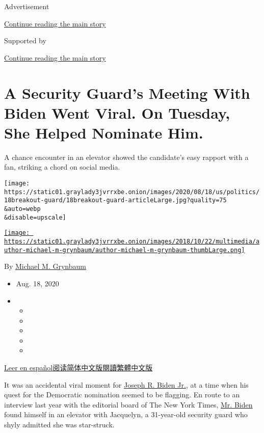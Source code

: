 Advertisement

\protect\hyperlink{after-top}{Continue reading the main story}

Supported by

\protect\hyperlink{after-sponsor}{Continue reading the main story}

\hypertarget{a-security-guards-meeting-with-biden-went-viral-on-tuesday-she-helped-nominate-him}{%
\section{A Security Guard's Meeting With Biden Went Viral. On Tuesday,
She Helped Nominate
Him.}\label{a-security-guards-meeting-with-biden-went-viral-on-tuesday-she-helped-nominate-him}}

A chance encounter in an elevator showed the candidate's easy rapport
with a fan, striking a chord on social media.

\texttt{[image: https://static01.graylady3jvrrxbe.onion/images/2020/08/18/us/politics/18breakout-guard/18breakout-guard-articleLarge.jpg?quality=75\\\&auto=webp\\\&disable=upscale]}

\href{https://www.nytimes3xbfgragh.onion/by/michael-m-grynbaum}{\texttt{[image: https://static01.graylady3jvrrxbe.onion/images/2018/10/22/multimedia/author-michael-m-grynbaum/author-michael-m-grynbaum-thumbLarge.png]}}

By
\href{https://www.nytimes3xbfgragh.onion/by/michael-m-grynbaum}{Michael
M. Grynbaum}

\begin{itemize}
\item
  Aug. 18, 2020
\item
  \begin{itemize}
  \item
  \item
  \item
  \item
  \item
  \end{itemize}
\end{itemize}

\href{https://www.nytimes3xbfgragh.onion/es/2020/08/19/espanol/estados-unidos/joe-biden-nominacion-guardia-seguridad.html}{Leer
en
español}\href{https://cn.nytimes3xbfgragh.onion/opinion/20200819/michelle-obama-dnc-election-2020/}{阅读简体中文版}\href{https://cn.nytimes3xbfgragh.onion/opinion/20200819/michelle-obama-dnc-election-2020/zh-hant/}{閱讀繁體中文版}

It was an accidental viral moment for
\href{https://www.nytimes3xbfgragh.onion/topic/person/joe-biden}{Joseph
R. Biden Jr.}, at a time when his quest for the Democratic nomination
seemed to be flagging. En route to an interview last year with the
editorial board of The New York Times,
\href{https://www.nytimes3xbfgragh.onion/2020/08/20/us/politics/Joe-Biden-accepts-democratic-nomination.html}{Mr.
Biden} found himself in an elevator with Jacquelyn, a 31-year-old
security guard who shyly admitted she was star-struck.


